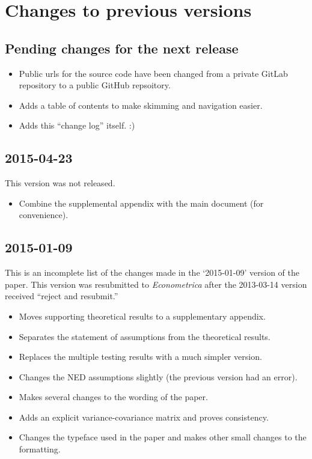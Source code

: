 \section{Changes to previous versions}
\subsection{Pending changes for the next release}

\begin{itemize}
\item Public urls for the source code have been changed from a private
GitLab repository to a public GitHub repsoitory.
\item Adds a table of contents to make skimming and navigation easier.
\item Adds this ``change log'' itself. :)
\end{itemize}

\subsection{2015-04-23}
This version was not released.

\begin{itemize}
\item Combine the supplemental appendix with the main document (for
convenience).
\end{itemize}

\subsection{2015-01-09}
This is an incomplete list of the changes made in the `2015-01-09'
version of the paper. This version was resubmitted to
\textit{Econometrica} after the 2013-03-14 version received ``reject
and resubmit.''

\begin{itemize}
\item Moves supporting theoretical results to a supplementary
appendix.
\item Separates the statement of assumptions from the theoretical
results.
\item Replaces the multiple testing results with a much simpler
version.
\item Changes the NED assumptions slightly (the previous version had
an error).
\item Makes several changes to the wording of the paper.
\item Adds an explicit variance-covariance matrix and proves
consistency.
\item Changes the typeface used in the paper and makes other small
changes to the formatting.
\end{itemize}

